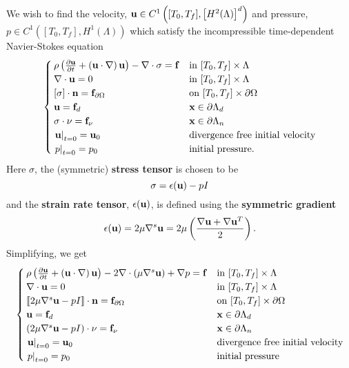 \documentclass[letterpaper]{erdc}
\begin{document}
We wish to find the velocity, $\textbf{u}\in C^{1}\left([T_0,T_f], \left[H^{2}(\Lambda)\right]^d\right)$ and pressure, $p\in C^{1}\left([T_0,T_f],H^{1}(\Lambda)\right)$ which satisfy the incompressible time-dependent Navier-Stokes equation
\begin{equation}\label{eq:nspde01}
  \begin{cases}
		\rho\left(\frac{\partial \textbf{u}}{\partial t} + \left(\textbf{u}\cdot\nabla\right)\textbf{u}  \right) - \nabla\cdot \sigma = \mathbf{f} & \mbox{in }[T_0,T_f]\times\Lambda\\
		\nabla\cdot \textbf{u} = 0 & \mbox{in }[T_0,T_f]\times\Lambda\\
		\left[\sigma \right]\cdot\textbf{n} = \mathbf{f}_{\partial\Omega}  & \mbox{on }[T_0,T_f]\times\partial\Omega \\
		\textbf{u} = \mathbf{f}_d  & \textbf{x} \in\partial\Lambda_{d}\\
		\sigma\cdot\nu = \mathbf{f}_{\nu} & \textbf{x}\in \partial\Lambda_{n}\\
		\left.\textbf{u}\right|_{t=0} = \textbf{u}_{0} & \mbox{divergence free initial velocity}\\
		\left.p\right|_{t=0} = p_0 & \mbox{initial pressure.}
	\end{cases}
\end{equation}
Here $\sigma$, the (symmetric) \textbf{stress tensor} is chosen to be
\begin{equation}
	 \sigma = \epsilon(\textbf{u}) - pI
\end{equation}
and the \textbf{strain rate tensor}, $\epsilon(\textbf{u})$, is defined using the \textbf{symmetric gradient}
\begin{equation}
	\epsilon(\textbf{u}) = 2\mu \nabla^{s} \textbf{u} = 2\mu\left(\frac{\nabla\textbf{u} + \nabla\textbf{u}^{T}}{2}\right).
\end{equation}
 Simplifying, we get
\begin{equation}\label{eq:nspde02}
  \begin{cases}
		\rho\left(\frac{\partial \textbf{u}}{\partial t} + \left(\textbf{u}\cdot\nabla\right)\textbf{u}  \right) - 2\nabla\cdot\left(\mu \nabla^{s}\textbf{u} \right) + \nabla p = \mathbf{f} & \mbox{in }[T_0,T_f]\times\Lambda\\
		\nabla\cdot \textbf{u} = 0 & \mbox{in }[T_0,T_f]\times\Lambda\\
		\left\llbracket 2\mu\nabla^{s}\textbf{u} - p I \right\rrbracket\cdot\textbf{n} = \mathbf{f}_{\partial\Omega}  & \mbox{on }[T_0,T_f]\times\partial\Omega \\
		\textbf{u} = \mathbf{f}_d  & \textbf{x} \in\partial\Lambda_{d}\\
		\left(2\mu\nabla^{s}\textbf{u}-p I\right)\cdot\nu = \mathbf{f}_{\nu} & \textbf{x}\in \partial\Lambda_{n}\\
		\left.\textbf{u}\right|_{t=0} = \textbf{u}_{0} & \mbox{divergence free initial velocity} \\
		\left.p\right|_{t=0} = p_0 & \mbox{initial pressure}
	\end{cases}
\end{equation}
\end{document}
